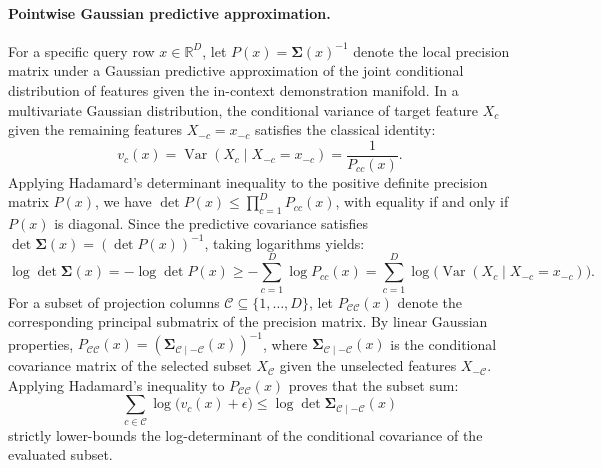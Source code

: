 \documentclass{article}
\begin{document}
\paragraph{Pointwise Gaussian predictive approximation.}
For a specific query row $x \in \mathbb{R}^D$, let $P(x) = \boldsymbol{\Sigma}(x)^{-1}$ denote the local precision matrix under a Gaussian predictive approximation of the joint conditional distribution of features given the in-context demonstration manifold. In a multivariate Gaussian distribution, the conditional variance of target feature $X_c$ given the remaining features $X_{-c} = x_{-c}$ satisfies the classical identity:
\begin{equation}
  v_c(x) = \operatorname{Var}(X_c \mid X_{-c} = x_{-c}) = \frac{1}{P_{cc}(x)}.
\end{equation}
Applying Hadamard's determinant inequality to the positive definite precision matrix $P(x)$, we have $\det P(x) \leq \prod_{c=1}^D P_{cc}(x)$, with equality if and only if $P(x)$ is diagonal. Since the predictive covariance satisfies $\det\boldsymbol{\Sigma}(x) = (\det P(x))^{-1}$, taking logarithms yields:
\begin{equation}
  \log\det\boldsymbol{\Sigma}(x) = -\log\det P(x) \geq -\sum_{c=1}^D \log P_{cc}(x) = \sum_{c=1}^D \log\bigl(\operatorname{Var}(X_c \mid X_{-c} = x_{-c})\bigr).
  \label{eq:hadamard-precision}
\end{equation}
For a subset of projection columns $\mathcal{C} \subseteq \{1, \dots, D\}$, let $P_{\mathcal{C}\mathcal{C}}(x)$ denote the corresponding principal submatrix of the precision matrix. By linear Gaussian properties, $P_{\mathcal{C}\mathcal{C}}(x) = (\boldsymbol{\Sigma}_{\mathcal{C}\mid -\mathcal{C}}(x))^{-1}$, where $\boldsymbol{\Sigma}_{\mathcal{C}\mid -\mathcal{C}}(x)$ is the conditional covariance matrix of the selected subset $X_{\mathcal{C}}$ given the unselected features $X_{-\mathcal{C}}$. Applying Hadamard's inequality to $P_{\mathcal{C}\mathcal{C}}(x)$ proves that the subset sum:
\begin{equation}
  \sum_{c \in \mathcal{C}} \log\bigl(v_c(x) + \epsilon\bigr) \leq \log\det\boldsymbol{\Sigma}_{\mathcal{C}\mid -\mathcal{C}}(x)
\end{equation}
strictly lower-bounds the log-determinant of the conditional covariance of the evaluated subset.
\end{document}
